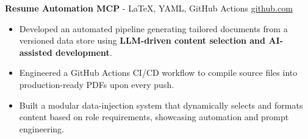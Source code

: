 \documentclass[11pt]{article}       %
\begin{document}

\textbf{Resume Automation MCP}{ - LaTeX, YAML, GitHub Actions} \hfill \href{https://github.com/Monica20030707/Tex_OrangeLeaf-mcp}{github.com} \\
\vspace{-9pt}
\begin{itemize}
  \item Developed an automated pipeline generating tailored documents from a versioned data store using \textbf{LLM-driven content selection and AI-assisted development}.
  \item Engineered a GitHub Actions CI/CD workflow to compile source files into production-ready PDFs upon every push.
  \item Built a modular data-injection system that dynamically selects and formats content based on role requirements, showcasing automation and prompt engineering.
\end{itemize}
\end{document}
